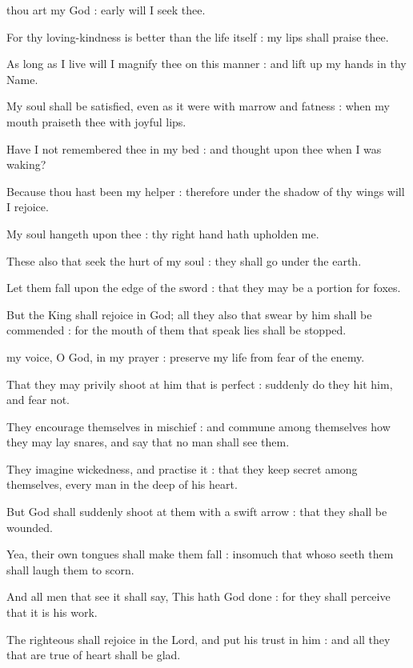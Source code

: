  thou art my God : early will I seek thee.\par
{}
For thy loving-kindness is better than the life itself : my lips shall praise thee.\par
{}As long as I live will I magnify thee on this manner : and lift up my hands in thy Name.\par
{}My soul shall be satisfied, even as it were with marrow and fatness : when my mouth praiseth thee with joyful lips.\par
{}Have I not remembered thee in my bed : and thought upon thee when I was waking?\par
{}Because thou hast been my helper : therefore under the shadow of thy wings will I rejoice.\par
{}My soul hangeth upon thee : thy right hand hath upholden me.\par
{}These also that seek the hurt of my soul : they shall go under the earth.\par
{}Let them fall upon the edge of the sword : that they may be a portion for foxes.\par
{}But the King shall rejoice in God; all they also that swear by him shall be commended : for the mouth of them that speak lies shall be stopped.\par


 my voice, O God, in my prayer : preserve my life from fear of the enemy.\par
{}
That they may privily shoot at him that is perfect : suddenly do they hit him, and fear not.\par
{}They encourage themselves in mischief : and commune among themselves how they may lay snares, and say that no man shall see them.\par
{}They imagine wickedness, and practise it : that they keep secret among themselves, every man in the deep of his heart.\par
{}But God shall suddenly shoot at them with a swift arrow : that they shall be wounded.\par
{}Yea, their own tongues shall make them fall : insomuch that whoso seeth them shall laugh them to scorn.\par
{}And all men that see it shall say, This hath God done : for they shall perceive that it is his work.\par
{}The righteous shall rejoice in the Lord, and put his trust in him : and all they that are true of heart shall be glad.\par


